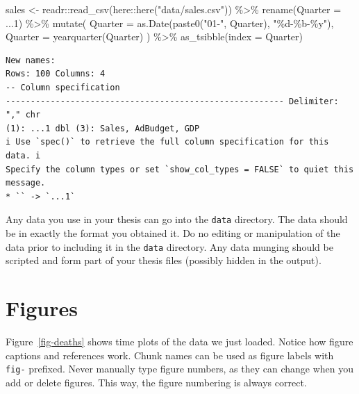 \documentclass[letterpaper,             %
               oneside,                 %
               \pointsize]              %
               {memoir}
\newenvironment{Shaded}{\begin{snugshade}}{\end{snugshade}}
\newcommand{\SpecialCharTok}[1]{\textcolor[rgb]{0.00,0.00,0.00}{{#1}}}
\newcommand{\StringTok}[1]{\textcolor[rgb]{0.31,0.60,0.02}{{#1}}}
\newcommand{\OtherTok}[1]{\textcolor[rgb]{0.56,0.35,0.01}{{#1}}}
\newcommand{\FunctionTok}[1]{\textcolor[rgb]{0.00,0.00,0.00}{{#1}}}
\newcommand{\AttributeTok}[1]{\textcolor[rgb]{0.77,0.63,0.00}{{#1}}}
\newcommand{\NormalTok}[1]{{#1}}
\begin{document}
\begin{Shaded}
\begin{Highlighting}[]
\NormalTok{sales }\OtherTok{\textless{}{-}}\NormalTok{ readr}\SpecialCharTok{::}\FunctionTok{read\_csv}\NormalTok{(here}\SpecialCharTok{::}\FunctionTok{here}\NormalTok{(}\StringTok{"data/sales.csv"}\NormalTok{)) }\SpecialCharTok{\%\textgreater{}\%}
  \FunctionTok{rename}\NormalTok{(}\AttributeTok{Quarter =} \StringTok{\textasciigrave{}}\AttributeTok{...1}\StringTok{\textasciigrave{}}\NormalTok{) }\SpecialCharTok{\%\textgreater{}\%}
  \FunctionTok{mutate}\NormalTok{(}
    \AttributeTok{Quarter =} \FunctionTok{as.Date}\NormalTok{(}\FunctionTok{paste0}\NormalTok{(}\StringTok{"01{-}"}\NormalTok{, Quarter), }\StringTok{"\%d{-}\%b{-}\%y"}\NormalTok{),}
    \AttributeTok{Quarter =} \FunctionTok{yearquarter}\NormalTok{(Quarter)}
\NormalTok{  ) }\SpecialCharTok{\%\textgreater{}\%}
  \FunctionTok{as\_tsibble}\NormalTok{(}\AttributeTok{index =}\NormalTok{ Quarter)}
\end{Highlighting}
\end{Shaded}

\begin{verbatim}
New names:
Rows: 100 Columns: 4
-- Column specification
-------------------------------------------------------- Delimiter: "," chr
(1): ...1 dbl (3): Sales, AdBudget, GDP
i Use `spec()` to retrieve the full column specification for this data. i
Specify the column types or set `show_col_types = FALSE` to quiet this message.
* `` -> `...1`
\end{verbatim}

Any data you use in your thesis can go into the \texttt{data} directory.
The data should be in exactly the format you obtained it. Do no editing
or manipulation of the data prior to including it in the \texttt{data}
directory. Any data munging should be scripted and form part of your
thesis files (possibly hidden in the output).

\hypertarget{figures}{%
\section{Figures}\label{figures}}

Figure~\ref{fig-deaths} shows time plots of the data we just loaded.
Notice how figure captions and references work. Chunk names can be used
as figure labels with \texttt{fig-} prefixed. Never manually type figure
numbers, as they can change when you add or delete figures. This way,
the figure numbering is always correct.
\end{document}
